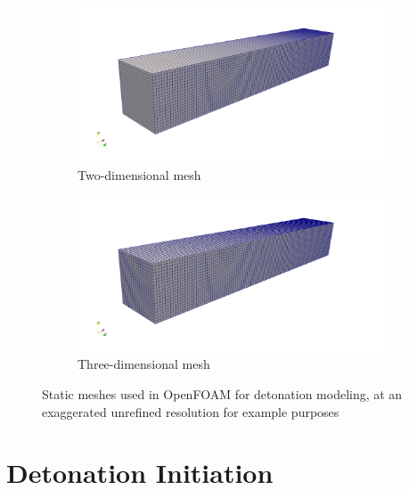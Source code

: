 \begin{figure}[]
    \centering
    \begin{subfigure}[]{\textwidth}
        \centering
        \includegraphics[width=\textwidth]{./figs/mesh/2Dmesh.png}
        \caption{Two-dimensional mesh}
    \end{subfigure}

    \begin{subfigure}[]{\textwidth}
        \centering
        \includegraphics[width=\textwidth]{./figs/mesh/3Dmesh.png}
        \caption{Three-dimensional mesh}
    \end{subfigure}
    \caption{Static meshes used in OpenFOAM for detonation modeling, at an exaggerated unrefined resolution for example purposes}
    \label{fig:meshcompare}
\end{figure}




\section{Detonation Initiation}
\label{sec:ignition}

